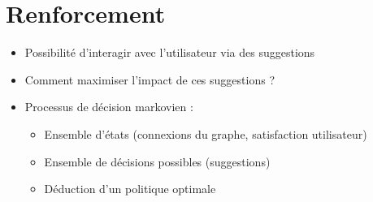 \documentclass[c]{beamer}
\begin{document}
\section{Renforcement}
\begin{frame}
    \begin{itemize}
        \item Possibilité d'interagir avec l'utilisateur via des suggestions
        \item Comment maximiser l'impact de ces suggestions ?
        \item Processus de décision markovien :
        \begin{itemize}
            \item Ensemble d'états (connexions du graphe, satisfaction
                utilisateur)
            \item Ensemble de décisions possibles (suggestions)
            \item Déduction d'un politique optimale
        \end{itemize}
    \end{itemize}
\end{frame}
\end{document}
